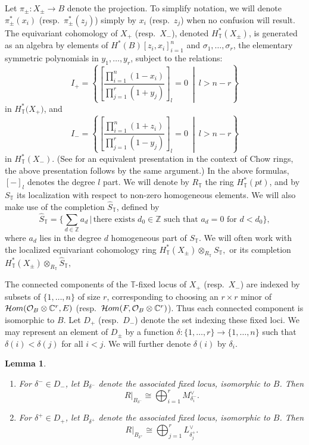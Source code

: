 \documentclass[11pt]{article}
\numberwithin{equation}{section}
\newtheorem{Lemma}[Theorem]{Lemma}
\numberwithin{equation}{section}
\newcommand{\cc}[1]{\mathcal{#1}} %
\newcommand{\CC}{\mathbb{C}}
\newcommand{\ZZ}{\mathbb{Z}}
\newcommand{\torus}{\mathbb{T}}
\newcommand{\F}{F}
\newcommand{\E}{E}
\newcommand{\MB}{M}
\newcommand{\LB}{L}
\newcommand{\z}{z}
\newcommand{\x}{x}
\newcommand{\y}{y}
\begin{document}
Let
$\pi_{\pm}\colon X_\pm \to B$ denote the projection. To simplify notation, we will denote $\pi_\pm^*(x_i)$ (resp.\ $\pi_\pm^*(z_j)$) simply by $x_i$ (resp.\ $z_j$) when no confusion will result.
The equivariant cohomology of $X_+$ (resp.\ $X_-$), denoted $H^*_\torus(X_{\pm})$, is generated as an algebra by elements of
$H^*(B)[\z_i, \x_i]_{i=1}^n$
and $\sigma_1, \dots, \sigma_r$, the elementary symmetric polynomials in $\y_1, \dots , \y_r$, subject to the relations:
\begin{equation*}%
I_+ = \left\{ \left[ \frac{\prod_{i=1}^n(1 - \x_i)}{\prod_{j=1}^r (1 + \y_j)}\right]_{l} = 0\ \middle| \ l> n-r \right\}
\end{equation*}
in $H^*_\torus\bigl(X_+\bigr)$, and
\begin{equation*}%
I_- = \left\{ \left[ \frac{\prod_{i=1}^n(1 + \z_i)}{\prod_{j=1}^r (1 - \y_j)}\right]_{l} = 0 \ \middle| \ l> n-r \right\}
\end{equation*}
in $H^*_\torus(X_-)$. (See \cite[Example 14.6.6]{Fulton} for an equivalent presentation in the context of Chow rings, the above presentation follows by the same argument.) In the above formulas, $\left[ - \right]_{l}$ denotes the degree $l$ part. We will denote by $R_\torus$ the ring $H^*_\torus(pt)$, and by $S_\torus$ its localization with respect to non-zero homogeneous elements. We will also make use of the completion
$\hat S_\torus$, defined by
\[
\hat S_\torus = \biggl\{ \sum_{d \in \ZZ} a_d \, \bigg| \, \text{there exists $d_0 \in \ZZ$ such that $a_d = 0$ for $d < d_0$}\biggr\},
\]
where $a_d$ lies in the degree $d$ homogeneous part of $S_\torus.$
We will often work with the localized equivariant cohomology ring $H^*_\torus(X_\pm) \otimes_{R_\torus} S_\torus,$ or its completion $H^*_\torus(X_\pm) \otimes_{R_\torus} \hat S_\torus,$


The connected components of the $\torus$-fixed locus of $X_+$ (resp.\ $X_-$) are indexed by subsets of $\{1, \dots, n\}$ of size $r$, corresponding to choosing an $r \times r$ minor of $\mathcal{H}{\rm om}(\cc O_B \otimes \CC^r, \E)$ (resp.\ $\mathcal{H}{\rm om}(\F, \cc O_B \otimes \CC^r)$). Thus each connected component is isomorphic to $B$. Let $D_{+}$ (resp.\ $D_{-}$) denote the set indexing these fixed loci.
We may represent an element of $D_\pm$ by a function $\delta\colon \{1, \dots, r\} \to \{1, \dots, n\}$ such that
$\delta(i)<\delta(j)$ for all $i<j$.
 We will further denote $\delta(i)$ by $\delta_i$.



\begin{Lemma}\label{l:rest}\quad
\begin{enumerate}\itemsep=0pt\itemsep=0pt
\item[$1.$] For $\delta^- \in D_{-}$, let $B_{\delta^-} $ denote the associated fixed locus, isomorphic to $B$. Then
\[ R|_{B_{\delta^-}} \cong \bigoplus_{i=1}^r \MB_{\delta^-_i}^\vee.\]
\item[$2.$] For $\delta^+ \in D_{+}$, let $B_{\delta^+} $ denote the associated fixed locus, isomorphic to $B$. Then
\[R|_{B_{\delta^+}} \cong \bigoplus_{j=1}^r \LB_{\delta^+_j}^\vee.\]
\end{enumerate}
\end{Lemma}
\end{document}
